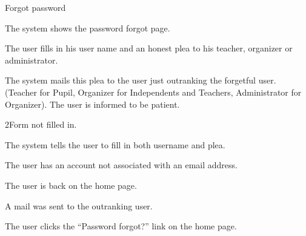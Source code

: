 
\begin{uc}{Forgot password}

    \begin{uc-mss}
    \item The system shows the password forgot page. %
    \item The user fills in his user name and an honest plea to his teacher,
        organizer or administrator.
    \item The system mails this plea to the user just outranking the forgetful
        user. (Teacher for Pupil, Organizer for Independents and Teachers,
        Administrator for Organizer). The user is informed to be patient.
    \end{uc-mss}

    \begin{uc-ext}

        \begin{uc-fail}{2}{Form not filled in.}
        \item The system tells the user to fill in both username and plea.
        \end{uc-fail}

    \end{uc-ext}

    \begin{uc-pre}
    \item The user has an account not associated with an email address.
    \end{uc-pre}

    \begin{uc-post}
    \item The user is back on the home page.
    \item A mail was sent to the outranking user.
    \end{uc-post}

    \begin{uc-trig}
        The user clicks the ``Password forgot?'' link on the home page.
    \end{uc-trig}

\end{uc}

